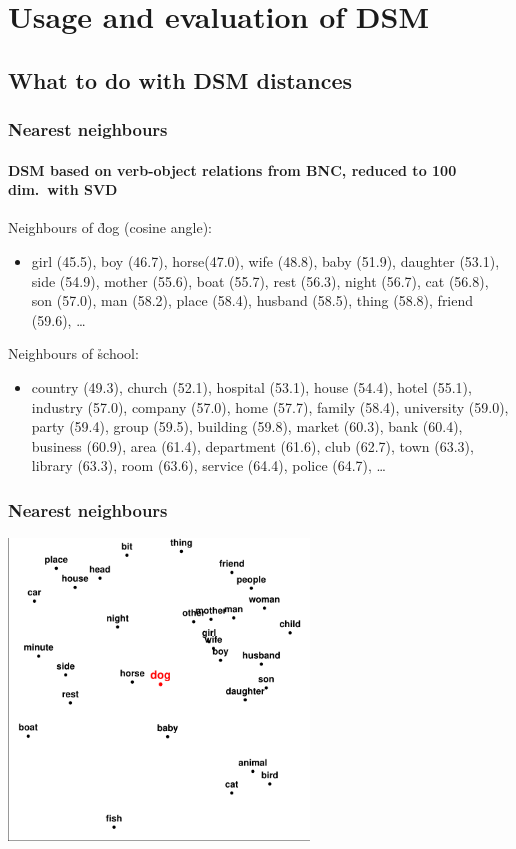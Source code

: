\section{Usage and evaluation of DSM}

\subsection{What to do with DSM distances}

\begin{frame}
  \frametitle{Nearest neighbours}
  \framesubtitle{DSM based on verb-object relations from BNC, reduced to 100 dim.\ with SVD}

  Neighbours of \h{dog} (cosine angle):
  \begin{itemize}\item[\hand]
    girl (45.5), boy (46.7), horse(47.0), wife (48.8), baby (51.9),
    daughter (53.1), side (54.9), mother (55.6), boat (55.7),
    rest (56.3), night (56.7), cat (56.8), son (57.0), man (58.2), 
    place (58.4), husband (58.5), thing (58.8), friend (59.6), \ldots
  \end{itemize}

  \gap
  Neighbours of \h{school}:
  \begin{itemize}\item[\hand]
    country (49.3), church (52.1), hospital (53.1), house (54.4),
    hotel (55.1), industry (57.0), company (57.0), home (57.7), family
    (58.4), university (59.0), party (59.4), group (59.5), building
    (59.8), market (60.3), bank (60.4), business (60.9), area (61.4),
    department (61.6), club (62.7), town (63.3), library (63.3), 
    room (63.6), service (64.4), police (64.7), \ldots
  \end{itemize}
\end{frame}

\begin{frame}[c]
  \frametitle{Nearest neighbours}

  \begin{center}
    \includegraphics[width=8cm]{img/neighbourhood_dog}
  \end{center}
\end{frame}

